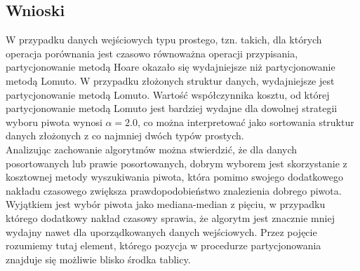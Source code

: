 \begin{figure}[]
	\centering
	
	\caption[]{}
	\label{fig:quick-sort-deterministic-pivot-all}
\end{figure}

\subsection{Wnioski}
W przypadku danych wejściowych typu prostego, tzn. takich, dla których operacja porównania jest czasowo równoważna operacji przypisania, partycjonowanie metodą Hoare okazało się wydajniejsze niż partycjonowanie metodą Lomuto. W przypadku złożonych struktur danych, wydajniejsze jest partycjonowanie metodą Lomuto. Wartość współczynnika kosztu, od której partycjonowanie metodą Lomuto jest bardziej wydajne dla dowolnej strategii wyboru piwota wynosi $\alpha = 2.0$, co można interpretować jako sortowania struktur danych złożonych z co najmniej dwóch typów prostych.\\

Analizując zachowanie algorytmów można stwierdzić, że dla danych posortowanych lub prawie posortowanych, dobrym wyborem jest skorzystanie z kosztownej metody wyszukiwania piwota, która pomimo swojego dodatkowego nakładu czasowego zwiększa prawdopodobieństwo znalezienia dobrego piwota. Wyjątkiem jest wybór piwota jako mediana-median z pięciu, w przypadku którego dodatkowy nakład czasowy sprawia, że algorytm jest znacznie mniej wydajny nawet dla uporządkowanych danych wejściowych. Przez pojęcie  rozumiemy tutaj element, którego pozycja w procedurze partycjonowania znajduje się możliwie blisko środka tablicy.\\
